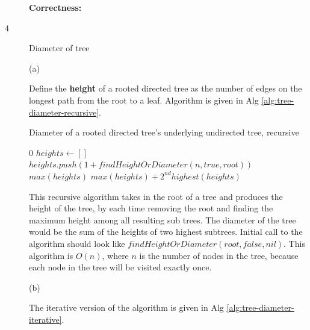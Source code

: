 \documentclass{article}
\begin{document}
\begin{description}
  \textbf{Correctness:}

\item[4]{Diameter of tree}
  
  (a)

  Define the \textbf{height} of a rooted directed tree as the number of edges on the longest path from the root to a leaf. Algorithm is given in Alg \ref{alg:tree-diameter-recursive}.

  \begin{algorithm}[h]
  \caption{Diameter of a rooted directed tree's underlying undirected tree, recursive}
  \label{alg:tree-diameter-recursive}
    \begin{algorithmic}[1]
        \State \Return $0$
      \EndIf
      \State $heights \gets []$
        \State $heights.push(1 + findHeightOrDiameter(n, true, root))$
      \EndFor
        \State \Return $max(heights)$
      \Else
        \State \Return $max(heights) + 2^{nd}highest(heights)$
      \EndIf
    \EndFunction
    \end{algorithmic}
  \end{algorithm}

  This recursive algorithm takes in the root of a tree and produces the height of the tree, by each time removing the root and finding the maximum height among all resulting sub trees. The diameter of the tree would be the sum of the heights of two highest subtrees. Initial call to the algorithm should look like $findHeightOrDiameter(root, false, nil)$. This algorithm is $O(n)$, where $n$ is the number of nodes in the tree, because each node in the tree will be visited exactly once.

  (b)

  The iterative version of the algorithm is given in Alg \ref{alg:tree-diameter-iterative}.


\end{description}
\end{document}
